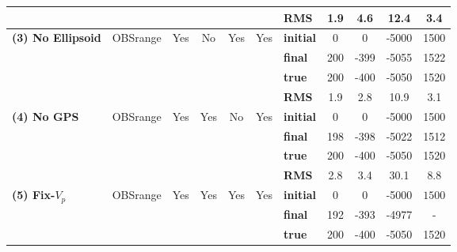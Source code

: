 \documentclass[10pt,titlepage]{article}
\begin{document}
\begin{table}
{\begin{tabular}{l | c c c c c | l c c c c}
\multirow{4}{*}{} & \multirow{4}{*}{} & \multirow{4}{*}{} & \multirow{4}{*}{} & \multirow{4}{*}{} & \multirow{4}{*}{} & \textbf{RMS} & 1.9 & 4.6 & 12.4 & 3.4 \\ 
\hline
\multirow{4}{*}{\textbf{(3) No Ellipsoid}} & \multirow{4}{*}{OBSrange} & \multirow{4}{*}{Yes} & \multirow{4}{*}{No} & \multirow{4}{*}{Yes} & \multirow{4}{*}{Yes} & \textbf{initial} & 0 & 0 & -5000 & 1500 \\ 
\multirow{4}{*}{} & \multirow{4}{*}{} & \multirow{4}{*}{} & \multirow{4}{*}{} & \multirow{4}{*}{} & \multirow{4}{*}{} & \textbf{final}& 200 & -399 & -5055 & 1522 \\ 
\multirow{4}{*}{} & \multirow{4}{*}{} & \multirow{4}{*}{} & \multirow{4}{*}{} & \multirow{4}{*}{} & \multirow{4}{*}{} & \textbf{true}& 200 & -400 & -5050 & 1520 \\ 
\multirow{4}{*}{} & \multirow{4}{*}{} & \multirow{4}{*}{} & \multirow{4}{*}{} & \multirow{4}{*}{} & \multirow{4}{*}{} & \textbf{RMS} & 1.9 & 2.8 & 10.9 & 3.1 \\ 
\hline
\multirow{4}{*}{\textbf{(4) No GPS}} & \multirow{4}{*}{OBSrange} & \multirow{4}{*}{Yes} & \multirow{4}{*}{Yes} & \multirow{4}{*}{No} & \multirow{4}{*}{Yes} & \textbf{initial} & 0 & 0 & -5000 & 1500 \\ 
\multirow{4}{*}{} & \multirow{4}{*}{} & \multirow{4}{*}{} & \multirow{4}{*}{} & \multirow{4}{*}{} & \multirow{4}{*}{} & \textbf{final}& 198 & -398 & -5022 & 1512 \\ 
\multirow{4}{*}{} & \multirow{4}{*}{} & \multirow{4}{*}{} & \multirow{4}{*}{} & \multirow{4}{*}{} & \multirow{4}{*}{} & \textbf{true}& 200 & -400 & -5050 & 1520 \\ 
\multirow{4}{*}{} & \multirow{4}{*}{} & \multirow{4}{*}{} & \multirow{4}{*}{} & \multirow{4}{*}{} & \multirow{4}{*}{} & \textbf{RMS} & 2.8 & 3.4 & 30.1 & 8.8 \\ 
\hline
\multirow{4}{*}{\textbf{(5) Fix-$V_p$}} & \multirow{4}{*}{OBSrange} & \multirow{4}{*}{Yes} & \multirow{4}{*}{Yes} & \multirow{4}{*}{Yes} & \multirow{4}{*}{Yes} & \textbf{initial} & 0 & 0 & -5000 & $\mathit{1500}$ \\ 
\multirow{4}{*}{} & \multirow{4}{*}{} & \multirow{4}{*}{} & \multirow{4}{*}{} & \multirow{4}{*}{} & \multirow{4}{*}{} & \textbf{final}& 192 & -393 & -4977 & - \\ 
\multirow{4}{*}{} & \multirow{4}{*}{} & \multirow{4}{*}{} & \multirow{4}{*}{} & \multirow{4}{*}{} & \multirow{4}{*}{} & \textbf{true}& 200 & -400 & -5050 & 1520 \\ 

\end{tabular}}
\end{table}
\end{document}
